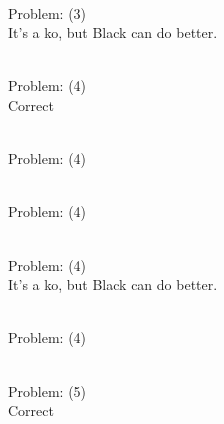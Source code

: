 \documentclass[11pt]{article}
\begin{document}
\begin{minipage}[t]{0.5\textwidth}
  {\centering
  
\\
Problem: (3)\\
It's a ko, but Black can do better.\\
  }
\end{minipage}
\begin{minipage}[t]{0.5\textwidth}
  {\centering
  
\\
Problem: (4)\\
Correct\\
  }
\end{minipage}
\begin{minipage}[t]{0.5\textwidth}
  {\centering
  
\\
Problem: (4)\\
  }
\end{minipage}
\begin{minipage}[t]{0.5\textwidth}
  {\centering
  
\\
Problem: (4)\\
  }
\end{minipage}
\begin{minipage}[t]{0.5\textwidth}
  {\centering
  
\\
Problem: (4)\\
It's a ko, but Black can do better.\\
  }
\end{minipage}
\begin{minipage}[t]{0.5\textwidth}
  {\centering
  
\\
Problem: (4)\\
  }
\end{minipage}
\begin{minipage}[t]{0.5\textwidth}
  {\centering
  
\\
Problem: (5)\\
Correct\\
  }
\end{minipage}
\end{document}
